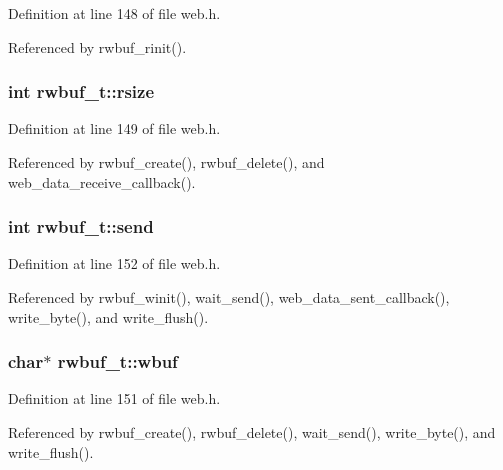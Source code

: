 Definition at line 148 of file web.\+h.



Referenced by rwbuf\+\_\+rinit().

\subsubsection[{\texorpdfstring{rsize}{rsize}}]{\setlength{\rightskip}{0pt plus 5cm}int rwbuf\+\_\+t\+::rsize}\hypertarget{structrwbuf__t_aa4094c7e329ae85cc50dbd06d3b50d44}{}\label{structrwbuf__t_aa4094c7e329ae85cc50dbd06d3b50d44}


Definition at line 149 of file web.\+h.



Referenced by rwbuf\+\_\+create(), rwbuf\+\_\+delete(), and web\+\_\+data\+\_\+receive\+\_\+callback().

\subsubsection[{\texorpdfstring{send}{send}}]{\setlength{\rightskip}{0pt plus 5cm}int rwbuf\+\_\+t\+::send}\hypertarget{structrwbuf__t_a279490994b6576ad00900254a8c07a89}{}\label{structrwbuf__t_a279490994b6576ad00900254a8c07a89}


Definition at line 152 of file web.\+h.



Referenced by rwbuf\+\_\+winit(), wait\+\_\+send(), web\+\_\+data\+\_\+sent\+\_\+callback(), write\+\_\+byte(), and write\+\_\+flush().

\subsubsection[{\texorpdfstring{wbuf}{wbuf}}]{\setlength{\rightskip}{0pt plus 5cm}char$\ast$ rwbuf\+\_\+t\+::wbuf}\hypertarget{structrwbuf__t_a68386231f3d907ec4508c090925782a2}{}\label{structrwbuf__t_a68386231f3d907ec4508c090925782a2}


Definition at line 151 of file web.\+h.



Referenced by rwbuf\+\_\+create(), rwbuf\+\_\+delete(), wait\+\_\+send(), write\+\_\+byte(), and write\+\_\+flush().

